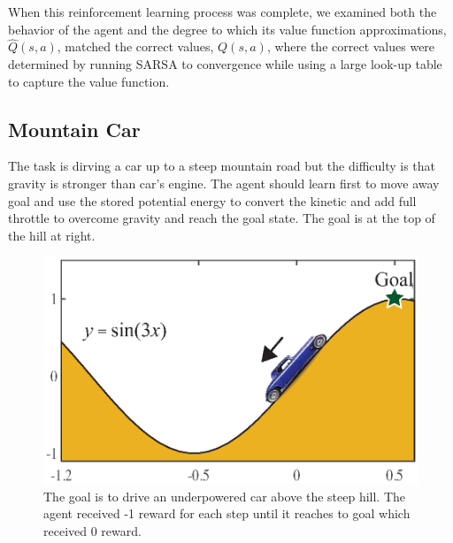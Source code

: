 \documentclass[preprint,12pt,authoryear]{elsarticle}
\begin{document}
When this reinforcement learning process was complete, we examined
both the behavior of the agent and the degree to which its value
function approximations, $\hat{Q}(s,a)$, matched the correct values,
$Q(s,a)$, where the correct values were determined by running SARSA
to convergence while using a large look-up table to capture the value
function.




\subsection{Mountain Car} %
\label{sub:mountain_car}

The task is dirving a car up to a steep mountain road but the difficulty is that gravity is stronger than car's engine. The agent should learn first to move away goal and use the stored potential energy to convert the kinetic and add full throttle to overcome gravity and reach the goal state. The goal is at the top of the hill at right. 
\begin{figure}
\begin{center}
\includegraphics[scale=0.5]{figures/mountainCar-schematic.eps}
\end{center}
\vspace{-4mm}
\caption{The goal is to drive an underpowered car above the steep hill. The agent received -1 reward for each step until it reaches to goal which received 0 reward.}
\label{fig:mountain_car}
\end{figure}
\end{document}
